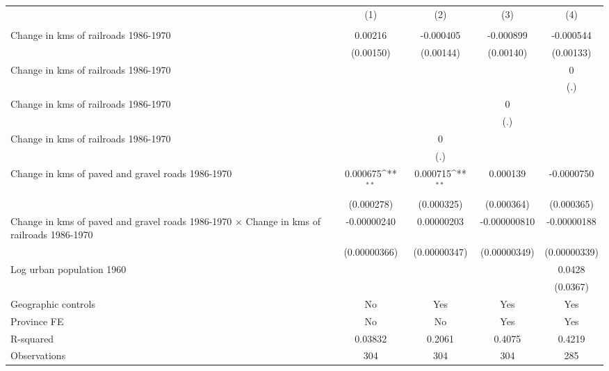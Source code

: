 {
\def\sym#1{\ifmmode^{#1}\else\(^{#1}\)\fi}
\begin{tabular}{l*{4}{c}}
\hline\hline
                &\multicolumn{1}{c}{(1)}&\multicolumn{1}{c}{(2)}&\multicolumn{1}{c}{(3)}&\multicolumn{1}{c}{(4)}\\
                &\multicolumn{1}{c}{}&\multicolumn{1}{c}{}&\multicolumn{1}{c}{}&\multicolumn{1}{c}{}\\
\hline
Change in kms of railroads 1986-1970&  0.00216         &-0.000405         &-0.000899         &-0.000544         \\
                &(0.00150)         &(0.00144)         &(0.00140)         &(0.00133)         \\
[1em]
Change in kms of railroads 1986-1970&                  &                  &                  &        0         \\
                &                  &                  &                  &      (.)         \\
[1em]
Change in kms of railroads 1986-1970&                  &                  &        0         &                  \\
                &                  &                  &      (.)         &                  \\
[1em]
Change in kms of railroads 1986-1970&                  &        0         &                  &                  \\
                &                  &      (.)         &                  &                  \\
[1em]
Change in kms of paved and gravel roads 1986-1970& 0.000675\sym{**} & 0.000715\sym{**} & 0.000139         &-0.0000750         \\
                &(0.000278)         &(0.000325)         &(0.000364)         &(0.000365)         \\
[1em]
Change in kms of paved and gravel roads 1986-1970 $\times$ Change in kms of railroads 1986-1970&-0.00000240         &0.00000203         &-0.000000810         &-0.00000188         \\
                &(0.00000366)         &(0.00000347)         &(0.00000349)         &(0.00000339)         \\
[1em]
Log urban population 1960&                  &                  &                  &   0.0428         \\
                &                  &                  &                  & (0.0367)         \\
\hline
Geographic controls&       No         &      Yes         &      Yes         &      Yes         \\
Province FE     &       No         &       No         &      Yes         &      Yes         \\
R-squared       &  0.03832         &   0.2061         &   0.4075         &   0.4219         \\
Observations    &      304         &      304         &      304         &      285         \\
\hline\hline
\end{tabular}
}
